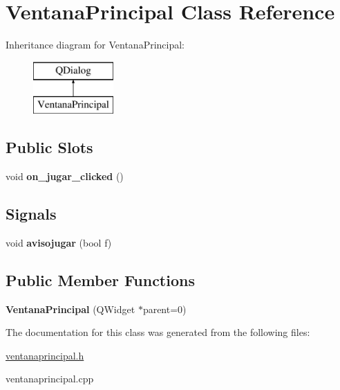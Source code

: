 \hypertarget{class_ventana_principal}{\section{Ventana\-Principal Class Reference}
\label{class_ventana_principal}
}
Inheritance diagram for Ventana\-Principal\-:\begin{figure}[H]
\begin{center}
\leavevmode
\includegraphics[height=2.000000cm]{class_ventana_principal}
\end{center}
\end{figure}
\subsection*{Public Slots}
\begin{DoxyCompactItemize}
\item 
\hypertarget{class_ventana_principal_a240d397814305d052a39d37f2790f763}{void {\bfseries on\-\_\-jugar\-\_\-clicked} ()}\label{class_ventana_principal_a240d397814305d052a39d37f2790f763}

\end{DoxyCompactItemize}
\subsection*{Signals}
\begin{DoxyCompactItemize}
\item 
\hypertarget{class_ventana_principal_ae9a4442771ee97d0335afa47c7d6a63b}{void {\bfseries avisojugar} (bool f)}\label{class_ventana_principal_ae9a4442771ee97d0335afa47c7d6a63b}

\end{DoxyCompactItemize}
\subsection*{Public Member Functions}
\begin{DoxyCompactItemize}
\item 
\hypertarget{class_ventana_principal_afc1895e635aa9cae6c2890882727f12b}{{\bfseries Ventana\-Principal} (Q\-Widget $\ast$parent=0)}\label{class_ventana_principal_afc1895e635aa9cae6c2890882727f12b}

\end{DoxyCompactItemize}


The documentation for this class was generated from the following files\-:\begin{DoxyCompactItemize}
\item 
\hyperlink{ventanaprincipal_8h}{ventanaprincipal.\-h}\item 
ventanaprincipal.\-cpp\end{DoxyCompactItemize}
